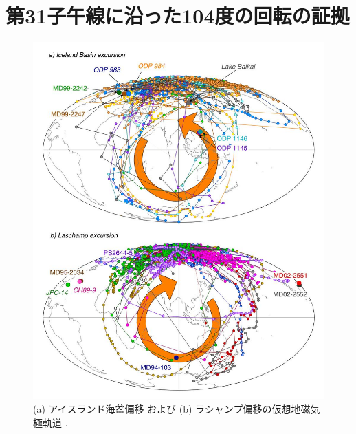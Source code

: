 \documentclass[10pt,twocolumn,letterpaper]{article}
\begin{document}


\section{第31子午線に沿った104度の回転の証拠}

\begin{figure}[t]
\begin{center}
   \includegraphics[width=0.95\linewidth]{laj.jpg}
\end{center}
   \caption{(a) アイスランド海盆偏移 および (b) ラシャンプ偏移の仮想地磁気極軌道 \cite{35}.}
\label{fig:7}
\label{fig:onecol}
\end{figure}
\end{document}
